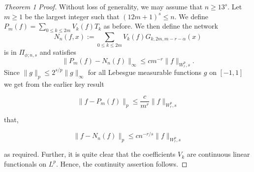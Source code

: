 \documentclass[11pt,a4paper]{article}
\theoremstyle{plain}
\theoremstyle{definition}
\theoremstyle{remark}
\begin{document}
\begin{proof}[Theorem 1 Proof]

Without loss of generality, we may assume that \( n \geq 13^s \). Let \( m \geq 1 \) be the largest integer such that \( (12m + 1)^s \leq n \). We define \( P_m(f) = \sum_{0 \leq k \leq 2m} V_k(f)T_k \) as before. We then define the network
\begin{equation}
    N_n(f, x) := \sum_{0 \leq k \leq 2m} V_k(f)G_{k,2m,m-r-\alpha}(x)
\end{equation}
is in \( \Pi_{\phi;n,s} \) and satisfies
\begin{equation}
    \| P_m(f) - N_n(f) \|_{\infty} \leq cm^{-r} \| f \|_{W_r^p, s}.
\end{equation}
Since \( \| g \|_p \leq 2^{s/p} \| g \|_{\infty} \) for all Lebesgue measurable functions \( g \) on \( [-1,1] \) we get from the earlier key result

\begin{equation}
    \| f - P_m(f) \|_p \leq \frac{c}{m^r} \| f \|_{W_r^p, s}
\end{equation}

that,

\begin{equation}
    \| f - N_n(f) \|_p \leq cn^{-r/s} \| f \|_{W_r^p, s}
\end{equation}

as required. Further, it is quite clear that the coefficients \( V_k \) are continuous linear functionals on \( L^p \). Hence, the continuity assertion follows.
\end{proof}
\end{document}
